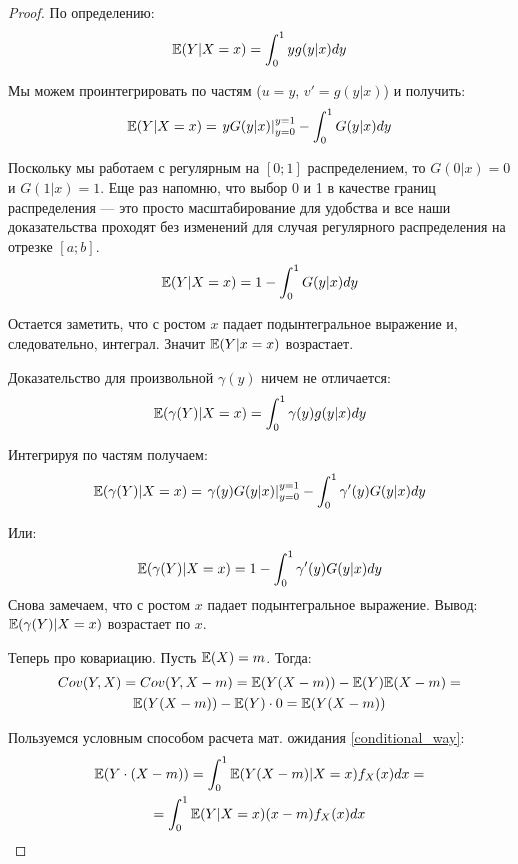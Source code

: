 \begin{proof}
По определению:
\begin{equation}
\mathbb{E}(Y|X=x)=\int_{0}^{1}yg(y|x)dy
\end{equation}

Мы можем проинтегрировать по частям ($ u=y $, $ v'=g(y|x) $) и получить:
\begin{equation}
\mathbb{E}(Y|X=x)=\left.yG(y|x)\right|_{y=0}^{y=1} - \int_{0}^{1}G(y|x)dy
\end{equation}

Поскольку мы работаем с регулярным на $ [0;1] $ распределением, то $ G(0|x)=0 $ и $ G(1|x)=1 $. Еще раз напомню, что выбор 0 и 1 в качестве границ распределения --- это просто масштабирование для удобства и все наши доказательства проходят без изменений для случая регулярного распределения на отрезке $ [a;b] $.
\begin{equation}
\mathbb{E}(Y|X=x)=1 - \int_{0}^{1}G(y|x)dy
\end{equation}

Остается заметить, что с ростом $ x $ падает подынтегральное выражение и, следовательно, интеграл. Значит $ \mathbb{E}(Y|x=x) $ возрастает.

Доказательство для произвольной $ \gamma(y) $ ничем не отличается:
\begin{equation}
\mathbb{E}(\gamma(Y)|X=x)=\int_{0}^{1}\gamma(y)g(y|x)dy
\end{equation}

Интегрируя по частям получаем:
\begin{equation}
\mathbb{E}(\gamma(Y)|X=x)=\left.\gamma(y)G(y|x)\right|_{y=0}^{y=1} - \int_{0}^{1}\gamma'(y)G(y|x)dy
\end{equation}

Или:
\begin{equation}
\mathbb{E}(\gamma(Y)|X=x)=1 - \int_{0}^{1}\gamma'(y)G(y|x)dy
\end{equation}
Снова замечаем, что с ростом $ x $ падает подынтегральное выражение. Вывод: $ \mathbb{E}(\gamma(Y)|X=x) $ возрастает по $x$.


Теперь про ковариацию. Пусть $ \mathbb{E}(X)=m $. Тогда:
\begin{multline}
Cov(Y,X)=Cov(Y,X-m)=\mathbb{E}(Y(X-m))-\mathbb{E}(Y)\mathbb{E}(X-m)=\\
\mathbb{E}(Y(X-m))-\mathbb{E}(Y)\cdot 0=\mathbb{E}(Y(X-m))
\end{multline}

Пользуемся условным способом расчета мат. ожидания \ref{conditional_way}:
\begin{multline}
\mathbb{E}(Y\cdot (X-m))=\int_{0}^{1} \mathbb{E}(Y(X-m)|X=x)f_{X}(x)dx=\\
=\int_{0}^{1}\mathbb{E}(Y|X=x)(x-m)f_{X}(x)dx
\end{multline}


\end{proof}
